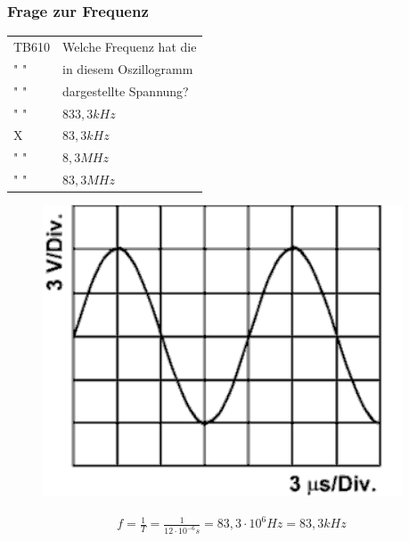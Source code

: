 \begin{frame}
  \frametitle{Frage zur Frequenz}
  \begin{minipage}{0.6\textwidth}
    \begin{tabular}{l||l}\hline
        TB610& Welche Frequenz hat die\\
        " " &  in diesem Oszillogramm\\
        " " & dargestellte Spannung?\\ \hline\hline
         " " & $833,3 kHz$ \\ \hline
         X & $83,3kHz$\\ \hline
         " "& $8,3MHz$ \\\hline
         " " & $83,3MHz$ \\\hline
      \end{tabular}
  \end{minipage}
  \begin{minipage}{0.3\textwidth}
    \begin{figure}
       \includegraphics[width=.9\textwidth]{e02/TB610}
     \end{figure}
    \end{minipage}
      \begin{align} 
        f=\frac{1}{T}=\frac{1}{12 \cdot 10^{-6}s}=83,3 \cdot 10^{6} Hz= 83,3 kHz
\end{align}
\end{frame}

